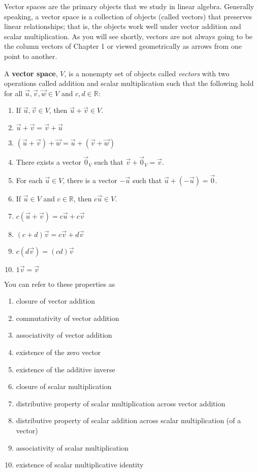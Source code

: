 Vector spaces are the primary objects that we study in linear algebra. Generally speaking, a vector space is a collection of objects (called vectors) that preserves linear relationships; that is, the objects work well under vector addition and scalar multiplication. As you will see shortly, vectors are not always going to be the column vectors of Chapter 1 or viewed geometrically as arrows from one point to another.
\begin{annotation}
\end{annotation}
\begin{definition}
A \textbf{vector space}, $V$, is a nonempty set of objects called \emph{vectors} with two operations called addition and scalar multiplication such that the following hold for all $\vec{u}, \vec{v}, \vec{w} \in V$ and $c,d \in \mathbb{R}$:
\begin{enumerate}
\item If $\vec{u}, \vec{v} \in V$, then $\vec{u}+\vec{v}\in V$.
\item $\vec{u}+\vec{v}=\vec{v}+\vec{u}$
\item $(\vec{u}+\vec{v})+\vec{w}=\vec{u}+(\vec{v}+\vec{w})$
\item There exists a vector $\vec{0}_V$ such that $\vec{v}+\vec{0}_V=\vec{v}$.
\item For each $\vec{u} \in V$, there is a vector $-\vec{u}$ such that $\vec{u} + (-\vec{u})=\vec{0}$.
\item If $\vec{u} \in V$ and $c \in \mathbb{R}$, then $c\vec{u} \in V$.
\item $c(\vec{u}+\vec{v})=c\vec{u}+c\vec{v}$
\item $(c+d)\vec{v}=c\vec{v}+d\vec{v}$
\item $c(d\vec{v})=(cd)\vec{v}$
\item $1 \vec{v}=\vec{v}$
\end{enumerate}
You can refer to these properties as
\begin{enumerate}
\item closure of vector addition
\item commutativity of vector addition
\item associativity of vector addition
\item existence of the zero vector
\item existence of the additive inverse
\item closure of scalar multiplication
\item distributive property of scalar multiplication across vector addition
\item distributive property of scalar addition across scalar multiplication (of a vector)
\item associativity of scalar multiplication
\item existence of scalar multiplicative identity
\end{enumerate}
\end{definition}
